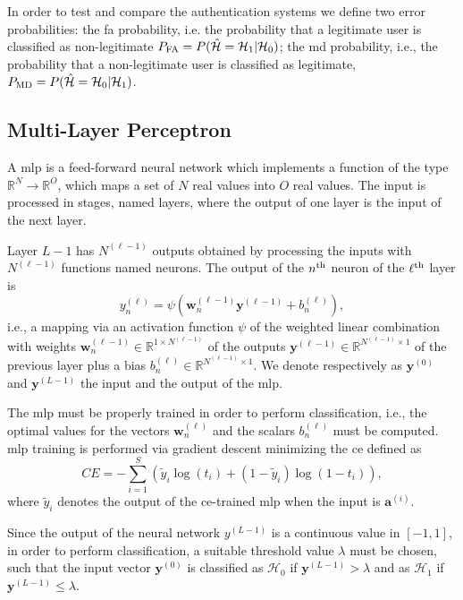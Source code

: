 \documentclass[twocolumns]{IEEEtran}
\begin{document}
In order to test and compare the authentication systems we define two error probabilities: the \ac{fa} probability, i.e. the probability  that a legitimate user is classified as non-legitimate $P_{\rm FA} =P(\hat{\mathcal H} = \mathcal H_1 | \mathcal H_0)$; the \ac{md} probability, i.e., the probability that a non-legitimate user is classified as legitimate, $P_{\rm MD}=P(\hat{\mathcal H} = \mathcal H_0 | \mathcal H_1)$.

\subsection{Multi-Layer Perceptron}\label{sec:nn}

A \ac{mlp} is a feed-forward neural network which implements a function of the type $\mathbb{R}^N \to \mathbb{R}^O$, which maps a set of $N$ real values into $O$ real values. The input is processed in stages, named layers, where the output of one layer is the input of the next layer.

Layer $L-1$ has $N^{(\ell-1)}$ outputs obtained by processing the inputs with $N^{(\ell-1)}$ functions named neurons. The output of the $n^{\rm th}$ neuron of the $\ell^{\rm th}$ layer is
\begin{equation}\label{eq:nonLin}
y_n^{(\ell)} = \psi\left( \bm{w}_n^{(\ell -1)}\bm{y}^{(\ell-1)}+b_n^{(\ell)} \right),
\end{equation}
i.e., a mapping via an activation function $\psi$ of the weighted linear combination with weights $\bm{w}_n^{(\ell -1)}\in \mathbb{R}^{1\times N^{(\ell-1)}}$ of the outputs $\bm{y}^{(\ell-1)} \in \mathbb{R}^{N^{(\ell-1)} \times 1 }$ of the previous layer plus a bias $b_n^{(\ell)} \in \mathbb{R}^{N^{(\ell-1)} \times 1 }$. We denote respectively as $\bm{y}^{(0)}$ and $\bm{y}^{(L-1)}$ the input and the output of the \ac{mlp}. 

The \ac{mlp} must be properly trained in order to perform classification, i.e., the optimal values for the vectors $\bm{w}_n^{(\ell)}$ and the scalars $b_n^{(\ell)}$ must be computed. \Ac{mlp} training is performed via gradient descent minimizing the \ac{ce} defined as
\begin{equation}\label{eq:ce}
CE = -\sum_{i=1}^{S}\left(\tilde{y}_i\log\left(t_i\right)+\left(1-\tilde{y}_i\right)\log\left(1-t_i\right) \right),
\end{equation}
where $\tilde{y}_i$ denotes the output of the \ac{ce}-trained \ac {mlp} when the input is $\bm{a}^{(i)}$.

Since the output of the neural network $y^{(L-1)}$ is a continuous value in $[-1,1]$, in order to perform classification, a suitable threshold value $\lambda$ must be chosen, such that the input vector $\bm{y}^{(0)}$ is classified as
$\mathcal{H}_0$ if $\bm{y}^{(L-1)} > \lambda$ and as $\mathcal{H}_1$ if $\bm{y}^{(L-1)} \le \lambda$.
\end{document}
